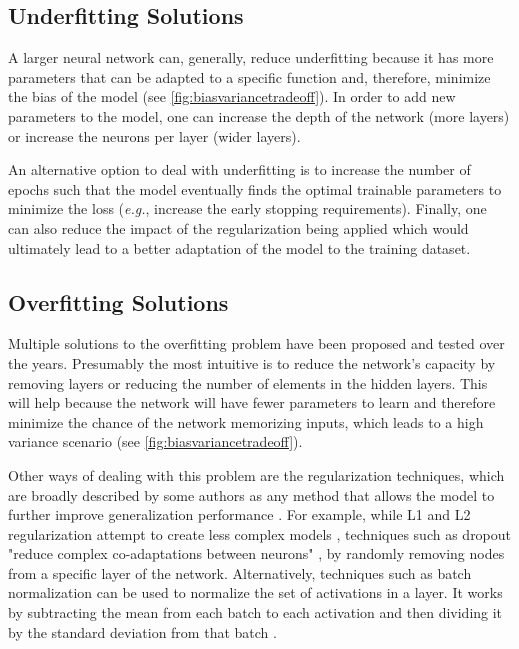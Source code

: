     \subsection{Underfitting Solutions}
    \label{section:underfitting}
    
    A larger neural network can, generally, reduce underfitting because it has more parameters that can be adapted to a specific function and, therefore, minimize the bias of the model (see \autoref{fig:biasvariancetradeoff}). In order to add new parameters to the model, one can increase the depth of the network (more layers) or increase the neurons per layer (wider layers). \par
    
    An alternative option to deal with underfitting is to increase the number of epochs such that the model eventually finds the optimal trainable parameters to minimize the loss (\textit{e.g.}, increase the early stopping requirements). Finally, one can also reduce the impact of the regularization being applied which would ultimately lead to a better adaptation of the model to the training dataset. \par
    
    \subsection{Overfitting Solutions}
    \label{section:overfitting}
    Multiple solutions to the overfitting problem have been proposed and tested over the years. Presumably the most intuitive is to reduce the network’s capacity by removing layers or reducing the number of elements in the hidden layers. This will help because the network will have fewer parameters to learn and therefore minimize the chance of the network memorizing inputs, which leads to a high variance scenario (see \autoref{fig:biasvariancetradeoff}). \par
    
    Other ways of dealing with this problem are the regularization techniques, which are broadly described by some authors as any method that allows the model to further improve generalization performance \cite{Nielsen2017a}. For example, while L1 and L2 regularization attempt to create less complex models \cite{Ng}, techniques such as dropout "reduce complex co-adaptations between neurons" \cite{Hinton2012}, by randomly removing nodes from a specific layer of the network. Alternatively, techniques such as batch normalization can be used to normalize the set of activations in a layer. It works by subtracting the mean from each batch to each activation and then dividing it by the standard deviation from that batch \cite{batchnorm}. \par
    
